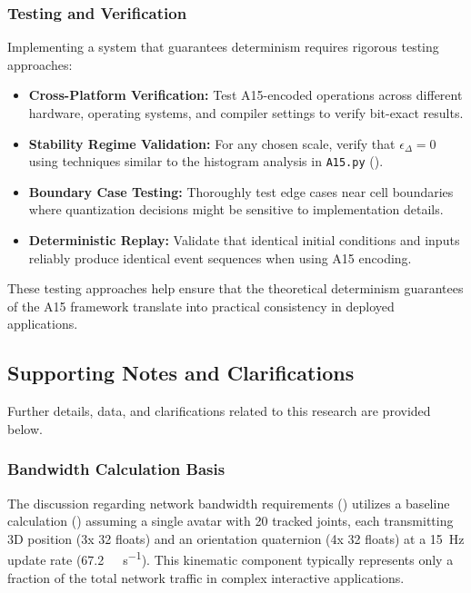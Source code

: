 \documentclass[10pt]{article}
\begin{document}
\subsubsection{Testing and Verification}\label{subsubsec-impl-testing}
Implementing a system that guarantees determinism requires rigorous testing approaches:

\begin{itemize}\itemsep0pt
    \item \textbf{Cross-Platform Verification:} Test A15-encoded operations across different hardware, operating systems, and compiler settings to verify bit-exact results.
    \item \textbf{Stability Regime Validation:} For any chosen scale, verify that $\epsilon_\Delta = 0$ using techniques similar to the histogram analysis in \texttt{A15.py} ().
    \item \textbf{Boundary Case Testing:} Thoroughly test edge cases near cell boundaries where quantization decisions might be sensitive to implementation details.
    \item \textbf{Deterministic Replay:} Validate that identical initial conditions and inputs reliably produce identical event sequences when using A15 encoding.
\end{itemize}

These testing approaches help ensure that the theoretical determinism guarantees of the A15 framework translate into practical consistency in deployed applications.

\subsection{Supporting Notes and Clarifications}\label{subsec-supplementary-notes}

Further details, data, and clarifications related to this research are provided below.

\subsubsection{Bandwidth Calculation Basis}\label{subsubsec-notes-bandwidth}
The discussion regarding network bandwidth requirements () utilizes a baseline calculation () assuming a single avatar with 20 tracked joints, each transmitting 3D position (3x \SI{32}{\bit} floats) and an orientation quaternion (4x \SI{32}{\bit} floats) at a \SI{15}{\hertz} update rate (\approx \SI{67.2}{\kilo\bit\per\second}). This kinematic component typically represents only a fraction of the total network traffic in complex interactive applications.
\end{document}
